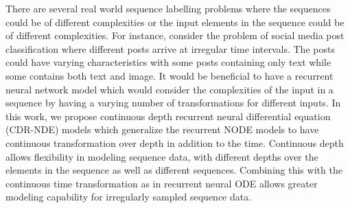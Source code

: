 \documentclass{article} %
\begin{document}
There are several real world sequence labelling problems where the sequences could be of different complexities or the input elements in the sequence could be of different complexities. For instance, consider the problem of social media post classification where different posts arrive at irregular time intervals. The  posts could have varying characteristics with some posts containing only text while some contains both text and image. It would be beneficial to have a recurrent neural network model which would consider the complexities of the input in a sequence by having a varying number of transformations for different inputs. In this work, we propose continuous depth recurrent neural differential equation (CDR-NDE) models which generalize the recurrent NODE models to have continuous transformation over depth in addition to the time. Continuous depth allows flexibility in modeling sequence data, with different depths over the elements in the sequence as well as different sequences. Combining this with the continuous time transformation as in recurrent neural ODE allows greater modeling capability for irregularly sampled sequence data.
\end{document}
